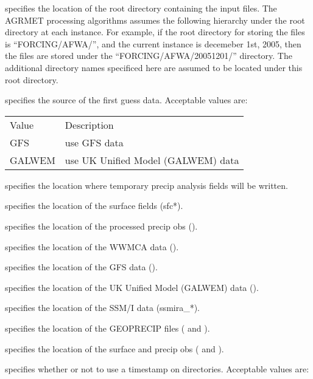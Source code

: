  
  specifies the location of the root
 directory containing the input files. The AGRMET processing algorithms
 assumes the following hierarchy under the root directory at each
 instance.  For example, if the root directory for storing the files
 is ``FORCING/AFWA/'', and the current instance is decemeber 1st, 2005,
 then the files are stored under the ``FORCING/AFWA/20051201/''
 directory.
 The additional directory names specificed here are assumed to be
 located under this root directory.

  specifies the source of the first
 guess data.
 Acceptable values are:

 \begin{tabular}{ll}
 Value  & Description             \\
 GFS    & use GFS data            \\
 GALWEM & use UK Unified Model (GALWEM) data \\
 \end{tabular}

  specifies the location where temporary 
 precip analysis fields will be written.

  specifies the location of the
 surface fields (sfc*).

  specifies the location of the
 processed precip obs ().

  specifies the location of the
 WWMCA data ().

  specifies the location of the
 GFS data ().

  specifies the location of the
 UK Unified Model (GALWEM) data
 ().

  specifies the location of the
 SSM/I data (ssmira\_*).

  specifies the location of the
 GEOPRECIP files ( and ).

  specifies the location of the
 surface and precip obs ( and ).

  specifies whether or not
 to use a timestamp on directories.
 Acceptable values are:

